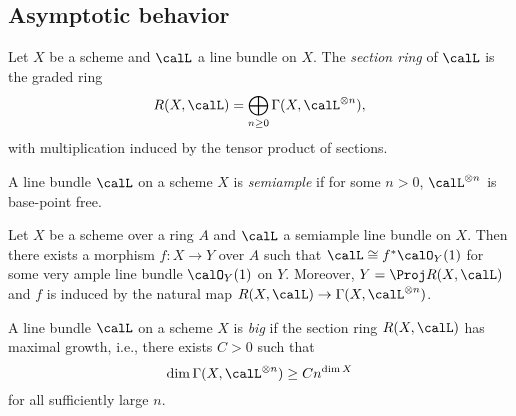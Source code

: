 \subsection{Asymptotic behavior}

    \begin{definition}\label{def:section_ring}
        Let \(X\) be a scheme and \(\calL\) a line bundle on \(X\).
        The \emph{section ring} of \(\calL\) is the graded ring
        \[
            R(X,\calL) = \bigoplus_{n\ge 0} \Gamma(X,\calL^{\otimes n}),
        \]
        with multiplication induced by the tensor product of sections.
        
    \end{definition}

    \begin{definition}\label{def:semiample_line_bundle}
        A line bundle \(\calL\) on a scheme \(X\) is \emph{semiample} if for some \(n>0\), \(\calL^{\otimes n}\) is base-point free.
        
    \end{definition}

    \begin{theorem}\label{thm:fibration_associated_to_semiample_line_bundle}
        Let \(X\) be a scheme over a ring \(A\) and \(\calL\) a semiample line bundle on \(X\).
        Then there exists a morphism \(f:X\to Y\) over \(A\) such that \(\calL\cong f^*\calO_Y(1)\) for some very ample line bundle \(\calO_Y(1)\) on \(Y\).
        Moreover, \(Y=\Proj R(X,\calL)\) and \(f\) is induced by the natural map \(R(X,\calL)\to \Gamma(X,\calL^{\otimes n})\).
        
    \end{theorem}

    \begin{definition}\label{def:big_line_bundle}
        A line bundle \(\calL\) on a scheme \(X\) is \emph{big} if the section ring \(R(X,\calL)\) has maximal growth, i.e., there exists \(C>0\) such that
        \[
            \dim \Gamma(X,\calL^{\otimes n}) \ge C n^{\dim X}
        \]
        for all sufficiently large \(n\).
        
    \end{definition}

